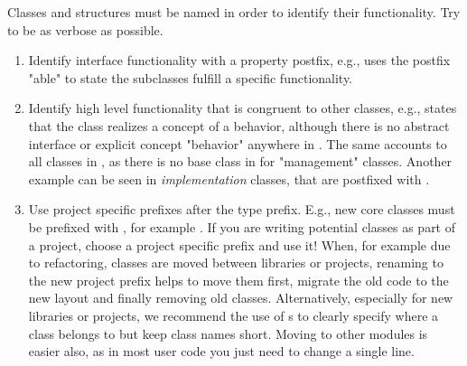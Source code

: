 Classes and structures must be named in order to identify their functionality.
Try to be as verbose as possible.
\begin{enumerate}
\item Identify interface functionality with a property postfix, e.g.,  uses the postfix "able" to state the subclasses fulfill a specific functionality.
\item Identify high level functionality that is congruent to other classes, e.g.,  states that the class realizes a concept of a behavior, although there is no abstract interface or explicit concept "behavior" anywhere in .
The same accounts to all  classes in , as there is no base class in  for "management" classes.
Another example can be seen in \emph{implementation} classes, that are postfixed with .
\item Use project specific prefixes after the type prefix.
E.g., new  core classes must be prefixed with , for example .
If you are writing potential  classes as part of a project, choose a project specific prefix and use it!
When, for example due to refactoring, classes are moved between libraries or projects, renaming to the new project prefix helps to move them first, migrate the old code to the new layout and finally removing old classes.
Alternatively, especially for new libraries or projects, we recommend the use of s to clearly specify where a class belongs to but keep class names short. Moving to other modules is easier also, as in most user code you just need to change a single  line.
\end{enumerate}




